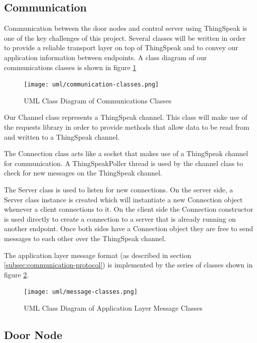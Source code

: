 \subsection{Communication}
\label{subsec:communication-software}

Communication between the door nodes and control server using ThingSpeak is one
of the key challenges of this project. Several classes will be written in order to
provide a reliable transport layer on top of ThingSpeak and to convey our
application information between endpoints. A class diagram of our communications
classes is shown in figure \ref{fig:communication-classes}

\begin{figure}[!htb]
\centering
\texttt{[image: uml/communication-classes.png]}
\caption{UML Class Diagram of Communications Classes}
\label{fig:communication-classes}
\end{figure}

Our Channel class represents a ThingSpeak channel. This class will make use of
the requests library in order to provide methods that allow data to be read
from and written to a ThingSpeak channel.

The Connection class acts like a socket that makes use of a ThingSpeak channel
for communication. A ThingSpeakPoller thread is used by the channel class to
check for new messages on the ThingSpeak channel.

The Server class is used to listen for new connections. On the server side, a
Server class instance is created which will instantiate a new Connection object
whenever a client connections to it. On the client side the Connection
constructor is used directly to create a connection to a server that is already
running on another endpoint. Once both sides have a Connection object they are
free to send messages to each other over the ThingSpeak channel.

The application layer message format (as described in section
\ref{subsec:communication-protocol}) is implemented by the series of classes
shown in figure \ref{fig:message-classes}.

\begin{figure}[!htb]
\centering
\texttt{[image: uml/message-classes.png]}
\caption{UML Class Diagram of Application Layer Message Classes}
\label{fig:message-classes}
\end{figure}

\subsection{Door Node}

